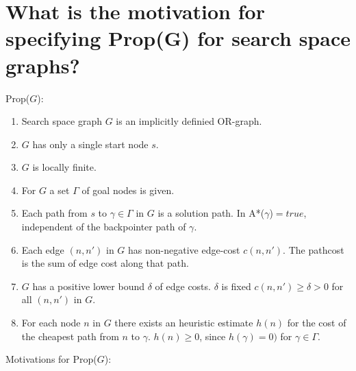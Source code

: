 \documentclass[12pt, a4paper]{article}
\begin{document}
\section{What is the motivation for specifying Prop(G) for search space graphs?}
Prop($G$):
\begin{enumerate}
\item Search space graph $G$ is an implicitly definied OR-graph.
\item $G$ has only a single start node $s$.
\item $G$ is locally finite.
\item For $G$ a set $\Gamma$ of goal nodes is given. 
\item Each path from $s$ to $\gamma \in \Gamma$ in $G$ is a solution path. In A*($\gamma$)$= true$, independent of the backpointer path of $\gamma$.
\item Each edge $(n, n')$ in $G$ has non-negative edge-cost $c(n, n')$. The pathcost is the sum of edge cost along that path.
\item $G$ has a positive lower bound $\delta$ of edge costs. $\delta$ is fixed $c(n, n') \geq \delta > 0$ for all $(n, n')$ in $G$.
\item For each node $n$ in $G$ there exists an heuristic estimate $h(n)$ for the cost of the cheapest path from $n$ to $\gamma$. $h(n) \geq 0$, since $h(\gamma) = 0)$ for $\gamma \in \Gamma$.
\end{enumerate}
Motivations for Prop($G$):
\end{document}
